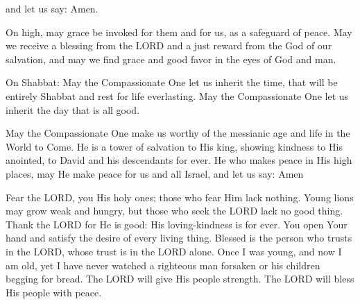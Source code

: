 \documentclass[12pt,twoside]{article}
\begin{document}
{\begin{minipage}[t]{\linewidth}
{and let us say: Amen.\par\vspace{0.2em}
On high, may grace be invoked for them and for us,  
as a safeguard of peace.  
May we receive a blessing from the LORD  
and a just reward from the God of our salvation,  
and may we find grace and good favor in the eyes of God and man.\par\vspace{0.2em}
On Shabbat: May the Compassionate One let us inherit  
the time, that will be entirely Shabbat  
and rest for life everlasting.  
May the Compassionate One let us inherit the day that is all good.\par\vspace{0.2em}
May the Compassionate One make us worthy  
of the messianic age and life in the World to Come.  
He is a tower of salvation to His king,  
showing kindness to His anointed,  
to David and his descendants for ever.  
He who makes peace in His high places,  
may He make peace for us and all Israel, and let us say: Amen

Fear the LORD, you His holy ones;  
those who fear Him lack nothing.  
Young lions may grow weak and hungry,  
but those who seek the LORD lack no good thing.  
Thank the LORD for He is good:  
His loving-kindness is for ever.  
You open Your hand  
and satisfy the desire of every living thing.  
Blessed is the person  
who trusts in the LORD,  
whose trust is in the LORD alone.  
Once I was young, and now I am old,  
yet I have never watched a righteous man forsaken  
or his children begging for bread.  
The LORD will give His people strength.  
The LORD will bless His people with peace.

}
\end{minipage}
}
\end{document}
